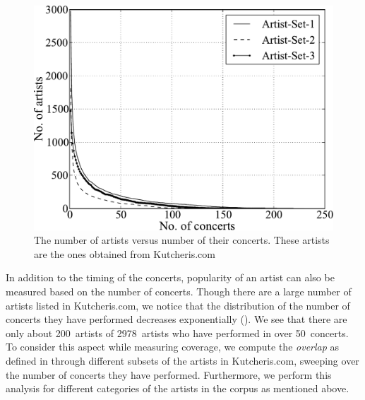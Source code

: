 \begin{figure}
	\begin{center}
		\includegraphics[width=\figSizeSixtyFive]{ch04_datasets/figures/performances-vs-artists.pdf}
	\end{center}
	\caption[Number of artists versus number of concerts]{The number of artists versus number of their concerts. These artists are the ones obtained from Kutcheris.com}
	\label{fig:number_artrist_vs_number_concerts}
\end{figure}

In addition to the timing of the concerts, popularity of an artist can also be measured based on the number of concerts. Though there are a large number of artists listed in Kutcheris.com, we notice that the distribution of the number of concerts they have performed decreases exponentially (). We see that there are only about 200~artists of 2978~artists who have performed in over 50~concerts. To consider this aspect while measuring coverage, we compute the \textit{overlap} as defined in  through different subsets of the artists in Kutcheris.com, sweeping over the number of concerts they have performed. Furthermore, we perform this analysis for different categories of the artists in the corpus as mentioned above.

